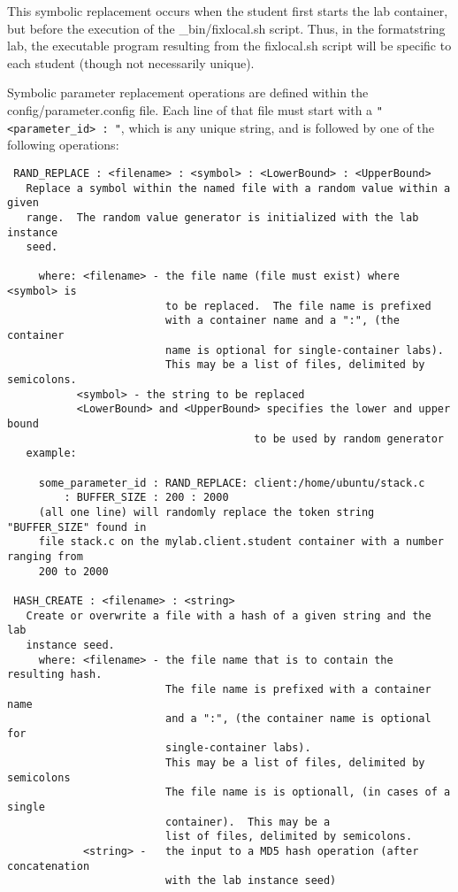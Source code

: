 \documentclass[12pt]{article}
\begin{document}
This symbolic replacement occurs when the student first starts the lab container,
but before the execution of the \_bin/fixlocal.sh script.  Thus, in the formatstring
lab, the executable program resulting from the fixlocal.sh script will be specific
to each student (though not necessarily unique).

Symbolic parameter replacement operations are defined within the config/parameter.config file.
Each line of that file must start with a \verb!"<parameter_id> : "!, which is any unique string, and
is followed by one of the following operations:

\begin{verbatim}
 RAND_REPLACE : <filename> : <symbol> : <LowerBound> : <UpperBound>
   Replace a symbol within the named file with a random value within a given
   range.  The random value generator is initialized with the lab instance
   seed.

     where: <filename> - the file name (file must exist) where <symbol> is 
                         to be replaced.  The file name is prefixed 
                         with a container name and a ":", (the container 
                         name is optional for single-container labs).  
                         This may be a list of files, delimited by semicolons. 
           <symbol> - the string to be replaced
           <LowerBound> and <UpperBound> specifies the lower and upper bound
                                       to be used by random generator
   example:

     some_parameter_id : RAND_REPLACE: client:/home/ubuntu/stack.c 
         : BUFFER_SIZE : 200 : 2000
     (all one line) will randomly replace the token string "BUFFER_SIZE" found in
     file stack.c on the mylab.client.student container with a number ranging from 
     200 to 2000
 
 HASH_CREATE : <filename> : <string>
   Create or overwrite a file with a hash of a given string and the lab 
   instance seed.
     where: <filename> - the file name that is to contain the resulting hash.
                         The file name is prefixed with a container name 
                         and a ":", (the container name is optional for 
                         single-container labs).  
                         This may be a list of files, delimited by semicolons 
                         The file name is is optionall, (in cases of a single
                         container).  This may be a 
                         list of files, delimited by semicolons.
            <string> -   the input to a MD5 hash operation (after concatenation 
                         with the lab instance seed)
                       

\end{verbatim}
\end{document}
